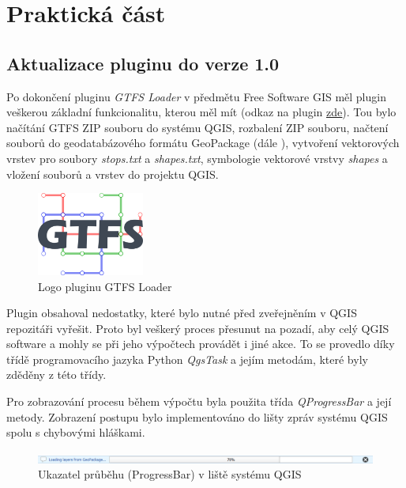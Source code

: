 \chapter{Praktická část}
\label{5-postup}

\section{Aktualizace pluginu do verze 1.0}
Po dokončení pluginu \textit{GTFS Loader} v předmětu Free Software GIS měl plugin veškerou základní
funkcionalitu, kterou měl mít (odkaz na plugin \href{https://github.com/ctu-fgis/2020-b-qgis-gtfs-plugin}
{\underline{zde}}). 
Tou bylo načítání GTFS ZIP souboru do systému QGIS,
rozbalení ZIP souboru, načtení  souborů do geodatabázového formátu GeoPackage (dále ),
vytvoření vektorových vrstev pro soubory \textit{stops.txt} a \textit{shapes.txt},
symbologie vektorové vrstvy \textit{shapes} a vložení   souborů a vrstev do projektu QGIS.

\begin{figure}[H] \centering
    \includegraphics[width=100pt]{./pictures/logo-plugin.png}
    \caption[Logo pluginu GTFS Loader]{Logo pluginu GTFS Loader}
	\label{fig:logo-plugin}              
\end{figure}   


Plugin obsahoval nedostatky, které bylo nutné před zveřejněním v QGIS repo\-zitáři vyřešit. 
Proto byl veškerý proces přesunut na pozadí, aby celý QGIS software  a
mohly se při jeho výpočtech provádět i jiné akce. To se provedlo díky třídě programovacího jazyka Python \textit{QgsTask}
a jejím metodám, které byly zděděny z této třídy. \cite{QgsTask}

Pro zobrazování procesu během výpočtu byla použita třída \textit{QProgressBar} a její metody.
Zobrazení postupu bylo implementováno do lišty zpráv systému QGIS spolu s chybovými hláškami.

\begin{figure}[H] \centering
    \includegraphics[width=400pt]{./pictures/loading.png}
    \caption[Ukazatel průběhu (ProgressBar) v liště systému QGIS]{Ukazatel průběhu (ProgressBar) v liště systému QGIS}
	\label{fig:ProgressBar v liště systému QGIS}              
\end{figure}     

